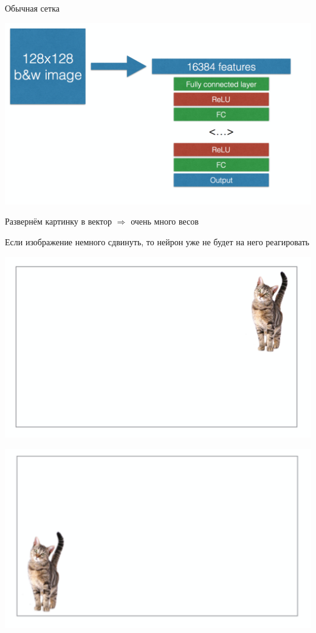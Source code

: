 \documentclass[notes,12pt, aspectratio=169]{beamer}
\newenvironment{wideitemize}{\itemize\addtolength{\itemsep}{10pt}}{\enditemize}
\begin{document}
\begin{frame}{Обычная сетка}
\begin{center}
	\includegraphics[width=.55\linewidth]{not_conv.png}
\end{center}

\begin{wideitemize}
	\item Развернём картинку в вектор $\Rightarrow$  \alert{очень много весов} 
	\item Если изображение немного сдвинуть, то нейрон уже не будет на него реагировать
\end{wideitemize}
\end{frame}


\begin{frame}
\begin{center}
	\includegraphics[width=.7\linewidth]{cat_1.png}
\end{center}
\end{frame}


\begin{frame}
\begin{center}
\includegraphics[width=.7\linewidth]{cat_2.png}
\end{center}
\end{frame}
\end{document}
